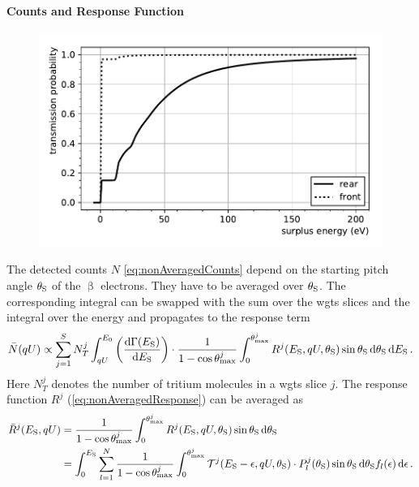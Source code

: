 \paragraph{Counts and Response Function}
\begin{figure}
    \centering
    \includegraphics[width=\textwidth]{chapter/katrin/fig/response.pdf}
    \label{fig:response}
\end{figure}
The detected counts $N$ \eqref{eq:nonAveragedCounts} depend on the starting pitch angle $\theta_\mathrm{S}$ of the $\upbeta$ electrons. They have to be averaged over $\theta_\mathrm{S}$. The corresponding integral can be swapped with the sum over the \gls{wgts} slices and the integral over the energy and propagates to the response term
\begin{align}
\label{eq:SSCcounts}
\bar{N}(qU) \propto \sum_{j=1}^S N_T^j
\int_{qU}^{E_0}
    \left(\frac{\mathop{}\!\mathrm{d} \Gamma(E_\mathrm{S})}{ \mathop{}\!\mathrm{d} E_\mathrm{S}}\right) \cdot
    \frac{1}{1-\cos\theta_\mathrm{max}^j}
    \int_{0}^{\theta_\mathrm{max}^j}
        R^j(E_\mathrm{S}, qU, \theta_\mathrm{S}) 
        \sin\theta_\mathrm{S} \mathop{}\!\mathrm{d} \theta_\mathrm{S}
\mathop{}\!\mathrm{d} E_\mathrm{S}
\text{\,.}
\end{align}
Here $N_T^j$ denotes the number of tritium molecules in a \gls{wgts} slice $j$. The response function $R^j$ (\ref{eq:nonAveragedResponse}) can be averaged as
\begin{equation}
\begin{split}
    \bar{R}^j(E_\mathrm{S},qU) &= 
    \frac{1}{1-\cos\theta_\mathrm{max}^j}
    \int_{0}^{\theta_\mathrm{max}^j}
        R^j(E_\mathrm{S}, qU, \theta_\mathrm{S}) 
    \sin\theta_\mathrm{S} \mathop{}\!\mathrm{d} \theta_\mathrm{S} \\ &=
    \int_0^{E_\mathrm{S}}
        \sum_{l=1}^{N}
            \frac{1}{1-\cos\theta_\mathrm{max}^j}
            \int_{0}^{\theta_\mathrm{max}^j}
            \mathcal{T}^j(E_\mathrm{S}-\epsilon, qU, \theta_\mathrm{S}) \cdot
            P^j_l(\theta_\mathrm{S})
            \sin\theta_\mathrm{S} \mathop{}\!\mathrm{d} \theta_\mathrm{S}
            f_l(\epsilon)
    \mathop{}\!\mathrm{d} \epsilon
    \text{\,.}
\end{split}
\end{equation}
